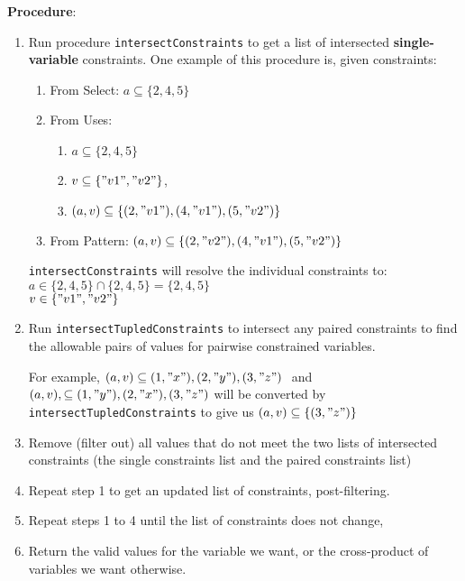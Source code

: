 \documentclass{article}
\begin{document}
\textbf{Procedure}: 
\begin{enumerate}
    \item Run procedure \texttt{intersectConstraints} to get a list of intersected \textbf{single-variable} constraints. One example of this procedure is, given constraints: 
    \begin{enumerate}
    \item From Select: $a \subseteq \{2, 4, 5\}$
    \item From Uses: 
    \begin{enumerate}
        \item $a \subseteq \{2, 4, 5\}$
        \item $v \subseteq \{"v1", "v2"\}$, 
        \item $(a, v) \subseteq \{(2, "v1"), (4, "v1"), (5, "v2")\}$
    \end{enumerate}
    \item From Pattern: $(a, v) \subseteq \{(2, "v2"), (4, "v1"), (5, "v2")\}$
\end{enumerate}

\texttt{intersectConstraints} will resolve the individual constraints to: \\
$a \in  \{2, 4, 5\}\cap  \{2, 4, 5\}  = \{2, 4, 5\}$ \\
$v \in \{"v1", "v2"\}$

\item Run \texttt{intersectTupledConstraints} to intersect any paired constraints to find the allowable pairs of values for pairwise constrained variables. 

For example, $(a, v) \subseteq {(1, "x"), (2, "y"), (3, "z")}$ ​ and
$(a, v), \subseteq {(1, "y"), (2, "x"), (3, "z")}$ will be converted by \texttt{intersectTupledConstraints} to give us  $(a, v) \subseteq \{(3, "z")\}$

\item Remove (filter out) all values that do not meet the two lists of
intersected constraints (the single constraints list and the paired constraints list)

\item Repeat step 1 to get an updated list of constraints, post-filtering.

\item Repeat steps 1 to 4 until the list of constraints does not change,

\item Return the valid values for the variable we want, or the cross-product of variables we want otherwise.
\end{enumerate}
\end{document}
